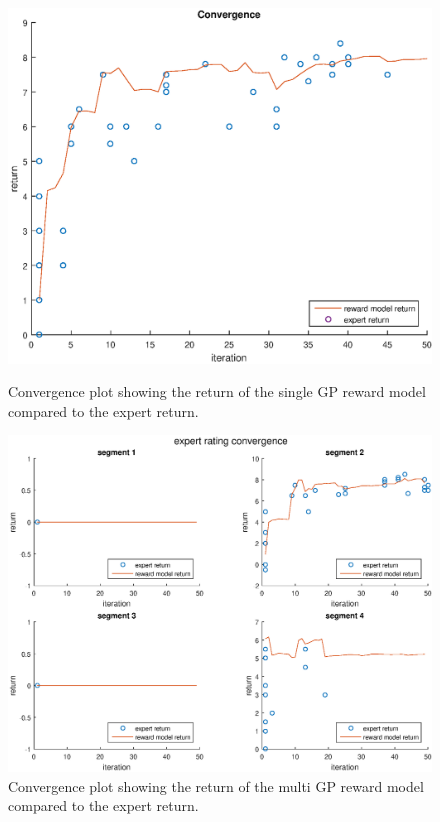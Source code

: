 \documentclass[mscThesis.tex]{subfiles}
\begin{document}
\begin{figure}[!htb]
    \centering
    \begin{minipage}{.5\textwidth}
        \centering
        \includegraphics[width=\textwidth, keepaspectratio=1]{figures/results/advancedx-var/convergence_single_manual.eps}
        \caption{Convergence plot showing the return of the single GP reward model compared to the expert return.}
        \label{fig:adxvar-single-manual-con}
    \end{minipage}%
    \begin{minipage}{0.5\textwidth}
        \centering
        \includegraphics[width=\textwidth, keepaspectratio=1]{figures/results/advancedx-var/convergence_multi_manual.eps}
        \caption{Convergence plot showing the return of the multi GP reward model compared to the expert return.}
        \label{fig:adxvar-multi-manual-con}
    \end{minipage}
\end{figure}
\end{document}
